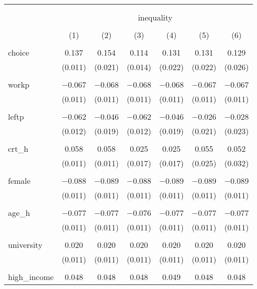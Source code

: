 
\begin{table}[!htbp] \centering 
  \caption{} 
  \label{} 
\begin{tabular}{@{\extracolsep{5pt}}lcccccc} 
\\[-1.8ex]\hline 
\hline \\[-1.8ex] 
\\[-1.8ex] & \multicolumn{6}{c}{inequality} \\ 
\\[-1.8ex] & (1) & (2) & (3) & (4) & (5) & (6)\\ 
\hline \\[-1.8ex] 
 choice & 0.137 & 0.154 & 0.114 & 0.131 & 0.131 & 0.129 \\ 
  & (0.011) & (0.021) & (0.014) & (0.022) & (0.022) & (0.026) \\ 
  & & & & & & \\ 
 workp & $-$0.067 & $-$0.068 & $-$0.068 & $-$0.068 & $-$0.067 & $-$0.067 \\ 
  & (0.011) & (0.011) & (0.011) & (0.011) & (0.011) & (0.011) \\ 
  & & & & & & \\ 
 leftp & $-$0.062 & $-$0.046 & $-$0.062 & $-$0.046 & $-$0.026 & $-$0.028 \\ 
  & (0.012) & (0.019) & (0.012) & (0.019) & (0.021) & (0.023) \\ 
  & & & & & & \\ 
 crt\_h & 0.058 & 0.058 & 0.025 & 0.025 & 0.055 & 0.052 \\ 
  & (0.011) & (0.011) & (0.017) & (0.017) & (0.025) & (0.032) \\ 
  & & & & & & \\ 
 female & $-$0.088 & $-$0.089 & $-$0.088 & $-$0.089 & $-$0.089 & $-$0.089 \\ 
  & (0.011) & (0.011) & (0.011) & (0.011) & (0.011) & (0.011) \\ 
  & & & & & & \\ 
 age\_h & $-$0.077 & $-$0.077 & $-$0.076 & $-$0.077 & $-$0.077 & $-$0.077 \\ 
  & (0.011) & (0.011) & (0.011) & (0.011) & (0.011) & (0.011) \\ 
  & & & & & & \\ 
 university & 0.020 & 0.020 & 0.020 & 0.020 & 0.020 & 0.020 \\ 
  & (0.011) & (0.011) & (0.011) & (0.011) & (0.011) & (0.011) \\ 
  & & & & & & \\ 
 high\_income & 0.048 & 0.048 & 0.048 & 0.049 & 0.048 & 0.048 \\ 

\end{tabular}
\end{table}

